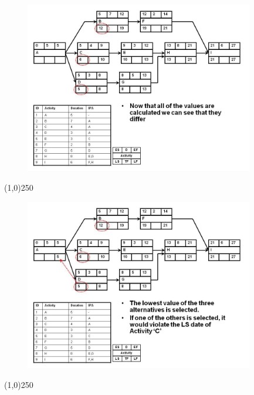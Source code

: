 \begin{frame}
\begin{figure}
	\centering
		\includegraphics[width = 10.0cm]{oldnotes/Slide158.jpg}
\end{figure}
\end{frame}
\begin{center}\line(1,0){250}\end{center}




\begin{frame}
\begin{figure}
	\centering
		\includegraphics[width = 10.0cm]{oldnotes/Slide159.jpg}
\end{figure}
\end{frame}
\begin{center}\line(1,0){250}\end{center}




